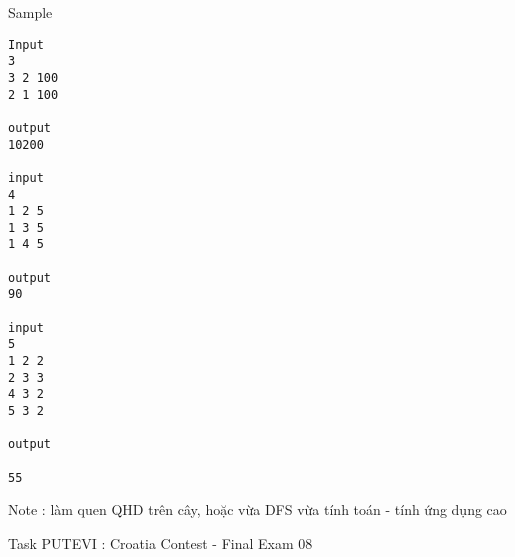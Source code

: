 Sample
\begin{verbatim}
Input 
3 
3 2 100 
2 1 100 
 
output 
10200 

input 
4 
1 2 5 
1 3 5 
1 4 5 

output 
90 

input 
5 
1 2 2 
2 3 3 
4 3 2 
5 3 2 
 
output 
 
55
\end{verbatim}

Note : làm quen QHD trên cây, hoặc vừa DFS vừa tính toán - tính ứng dụng cao


Task PUTEVI : Croatia Contest - Final Exam 08